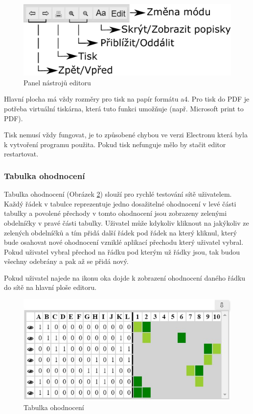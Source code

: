\documentclass[
  biblatex,
  glossaries,
]{kidiplom}
\begin{document}
\begin{figure}[h]
  \centering
  \includegraphics[width=\linewidth]{bar}
  \caption{Panel nástrojů editoru}\label{fig:Panel nástrojů editoru}
\end{figure}

\label{tisk}

Hlavní plocha má vždy rozměry pro tisk na papír formátu a4. Pro tisk 
do PDF je potřeba virtuální tiskárna, která tuto funkci umožňuje (např. Microsoft print to PDF).

Tisk nemusí vždy fungovat, je to způsobené chybou ve verzi Electronu 
která byla k vytvoření programu použita. Pokud tisk 
nefunguje mělo by stačit editor restartovat.

\subsubsection{Tabulka ohodnocení}\label{tabulka ohodnocení}

Tabulka ohodnocení (Obrázek \ref{fig:Tabulka ohodnocení obrázek}) slouží pro rychlé testování sítě uživatelem.
Každý řádek v tabulce reprezentuje jedno dosažitelné ohodnocení 
v levé části tabulky a povolené přechody v tomto ohodnocení jsou 
zobrazeny zelenými obdelníčky v pravé části tabulky.
Uživatel může kdykoliv kliknout na jakýkoliv ze zelených obdelníčků 
a tím přidá další řádek pod řádek na který kliknul, který bude osahovat 
nové ohodnocení vzniklé aplikací přechodu který uživatel vybral.
Pokud uživatel vybral přechod na řádku pod kterým už řádky jsou, 
tak budou všechny odebrány a pak až se přidá nový.

Pokud uživatel najede na ikonu oka dojde k zobrazení ohodnocení 
daného řádku do sítě na hlavní ploše editoru.

\begin{figure}[h]
  \centering
  \includegraphics[width=\linewidth]{tabulka}
  \caption{Tabulka ohodnocení}\label{fig:Tabulka ohodnocení obrázek}
\end{figure}
\end{document}
